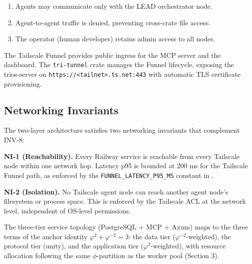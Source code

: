 \begin{enumerate}
\item Agents may communicate only with the LEAD orchestrator node.
\item Agent-to-agent traffic is denied, preventing cross-crate file access.
\item The operator (human developer) retains admin access to all nodes.
\end{enumerate}

The Tailscale Funnel provides public ingress for the MCP server and the dashboard. The \texttt{tri-tunnel} crate manages the Funnel lifecycle, exposing the trios-server on \texttt{https://<tailnet>.ts.net:443} with automatic TLS certificate provisioning.

\subsection{Networking Invariants}\label{fa_22:subsec:net-invariants}

The two-layer architecture satisfies two networking invariants that complement INV-8:

\textbf{NI-1 (Reachability).} Every Railway service is reachable from every Tailscale node within one network hop. Latency p95 is bounded at 200 ms for the Tailscale Funnel path, as enforced by the \texttt{FUNNEL\_LATENCY\_P95\_MS} constant in .

\textbf{NI-2 (Isolation).} No Tailscale agent node can reach another agent node's filesystem or process space. This is enforced by the Tailscale ACL at the network level, independent of OS-level permissions.

The three-tier service topology (PostgreSQL + MCP + Axum) maps to the three terms of the anchor identity \(\varphi^2 + \varphi^{-2} = 3\): the data tier (\(\varphi^{-2}\)-weighted), the protocol tier (unity), and the application tier (\(\varphi^2\)-weighted), with resource allocation following the same \(\phi\)-partition as the worker pool (Section 3).

